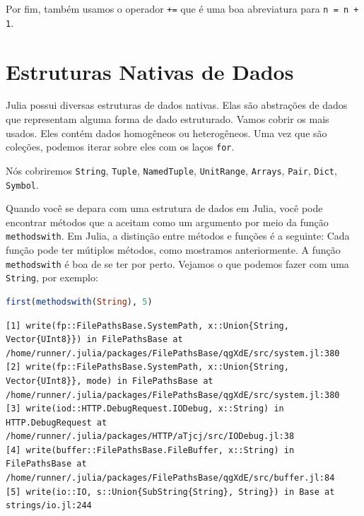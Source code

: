 \documentclass[
  notoc %
]{tufte-book}
\newcommand{\passthrough}[1]{#1}
\begin{document}
Por fim, também usamos o operador \passthrough{\lstinline!+=!} que é uma
boa abreviatura para \passthrough{\lstinline!n = n + 1!}.

\hypertarget{sec:data_structures}{%
\section{Estruturas Nativas de Dados}\label{sec:data_structures}}

Julia possui diversas estruturas de dados nativas. Elas são abstrações
de dados que representam alguma forma de dado estruturado. Vamos cobrir
os mais usados. Eles contém dados homogêneos ou heterogêneos. Uma vez
que são coleções, podemos iterar sobre eles com os laços
\passthrough{\lstinline!for!}.

Nós cobriremos \passthrough{\lstinline!String!},
\passthrough{\lstinline!Tuple!}, \passthrough{\lstinline!NamedTuple!},
\passthrough{\lstinline!UnitRange!}, \passthrough{\lstinline!Arrays!},
\passthrough{\lstinline!Pair!}, \passthrough{\lstinline!Dict!},
\passthrough{\lstinline!Symbol!}.

Quando você se depara com uma estrutura de dados em Julia, você pode
encontrar métodos que a aceitam como um argumento por meio da função
\passthrough{\lstinline!methodswith!}. Em Julia, a distinção entre
métodos e funções é a seguinte: Cada função pode ter mútiplos métodos,
como mostramos anteriormente. A função
\passthrough{\lstinline!methodswith!} é boa de se ter por perto. Vejamos
o que podemos fazer com uma \passthrough{\lstinline!String!}, por
exemplo:

\begin{lstlisting}[language=Julia]
first(methodswith(String), 5)
\end{lstlisting}

\begin{lstlisting}[language=Output]
[1] write(fp::FilePathsBase.SystemPath, x::Union{String, Vector{UInt8}}) in FilePathsBase at /home/runner/.julia/packages/FilePathsBase/qgXdE/src/system.jl:380
[2] write(fp::FilePathsBase.SystemPath, x::Union{String, Vector{UInt8}}, mode) in FilePathsBase at /home/runner/.julia/packages/FilePathsBase/qgXdE/src/system.jl:380
[3] write(iod::HTTP.DebugRequest.IODebug, x::String) in HTTP.DebugRequest at /home/runner/.julia/packages/HTTP/aTjcj/src/IODebug.jl:38
[4] write(buffer::FilePathsBase.FileBuffer, x::String) in FilePathsBase at /home/runner/.julia/packages/FilePathsBase/qgXdE/src/buffer.jl:84
[5] write(io::IO, s::Union{SubString{String}, String}) in Base at strings/io.jl:244
\end{lstlisting}
\end{document}
